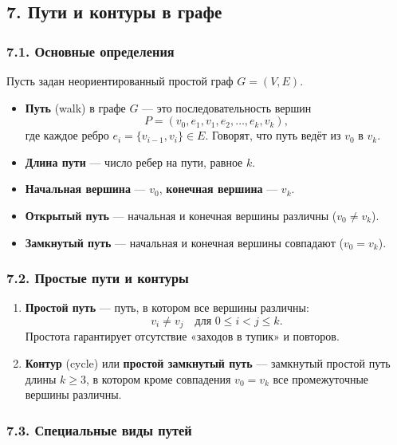 \subsection{7. Пути и контуры в графе}

\subsubsection{7.1. Основные определения}

Пусть задан неориентированный простой граф $G=(V,E)$.

\begin{itemize}[leftmargin=*]
  \item \textbf{Путь} (walk) в графе $G$ — это последовательность вершин
  \[
    P = (v_0, e_1, v_1, e_2, \dots, e_k, v_k),
  \]
  где каждое ребро $e_i = \{v_{i-1},v_i\}\in E$. Говорят, что путь ведёт из $v_0$ в $v_k$.
  \item \textbf{Длина пути} — число ребер на пути, равное $k$.
  \item \textbf{Начальная вершина} — $v_0$, \textbf{конечная вершина} — $v_k$.
  \item \textbf{Открытый путь} — начальная и конечная вершины различны ($v_0 \neq v_k$).
  \item \textbf{Замкнутый путь} — начальная и конечная вершины совпадают ($v_0 = v_k$).
\end{itemize}

\subsubsection{7.2. Простые пути и контуры}

\begin{enumerate}[label=\arabic*)]
  \item \textbf{Простой путь} — путь, в котором все вершины различны:
  \[
    v_i \neq v_j \quad\text{для }0\le i<j\le k.
  \]
  Простота гарантирует отсутствие «заходов в тупик» и повторов.
  \item \textbf{Контур} (cycle) или \textbf{простой замкнутый путь} — замкнутый простой путь длины $k\ge3$, в котором кроме совпадения $v_0=v_k$ все промежуточные вершины различны.
\end{enumerate}

\subsubsection{7.3. Специальные виды путей}

